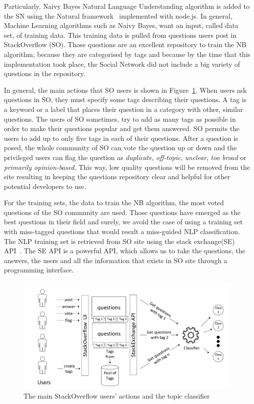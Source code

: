 Particularly, Naivy Bayes Natural Language Understanding algorithm is added to the SN using the Natural framework~\cite{nodenatural_url} implemented with node.js. In general, Machine Learning algorithms such as Naivy Bayes, want an input, called data set, of training data. This training data is pulled from questions users post in StackOverflow (SO). Those questions are an excellent repository to train the NB algorithm, because they are categorised by tags and because by the time that this implementation took place, the Social Network did not include a big variety of questions in the repository.

In general, the main actions that SO users is shown in Figure~\ref{fig:stackoverflow_questions}. When users ask questions in SO, they must specify some tags describing their questions. A tag is a keyword or a label that places their question in a category with other, similar questions. The users of SO sometimes, try to add as many tags as possible in order to make their questions popular and get them answered. SO permits the users to add up to only five tags in each of their questions. After a question is posed, the whole community of SO can vote the question up or down and the privileged users can flag the question as \emph{duplicate}, \emph{off-topic}, \emph{unclear}, \emph{too broad} or \emph{primarily opinion-based}. This way, low quality questions will be removed from the site resulting in keeping the questions repository clear and helpful for other potential developers to use.

For the training sets, the data to train the NB algorithm, the most voted questions of the SO community are used. Those questions have emerged as the best questions in their field and surely, we avoid the case of using a training set with miss-tagged questions that would result a miss-guided NLP classification. The NLP training set is retrieved from SO site using the stack exchange(SE) API~\cite{stackexchange_url}. The SE API is a powerful API, which allows us to take the questions, the answers, the users and all the information that exists in SO site through a programming interface.

\begin{figure}[h]
	\centering
	\includegraphics[width=1\textwidth]{./fig/StackOverFlow.pdf}
	\caption{The main StackOverflow users' actions and the topic classifier}
	\label{fig:stackoverflow_questions}
\end{figure}

